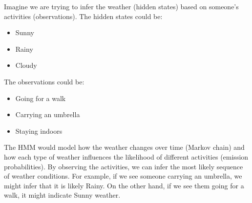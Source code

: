 \highspace
\begin{examplebox}
    Imagine we are trying to infer the weather (hidden states) based on someone's activities (observations). The hidden states could be:
    \begin{itemize}
        \item Sunny
        \item Rainy
        \item Cloudy
    \end{itemize}
    The observations could be:
    \begin{itemize}
        \item Going for a walk
        \item Carrying an umbrella
        \item Staying indoors
    \end{itemize}
    The HMM would model how the weather changes over time (Markov chain) and how each type of weather influences the likelihood of different activities (emission probabilities). By observing the activities, we can infer the most likely sequence of weather conditions. For example, if we see someone carrying an umbrella, we might infer that it is likely Rainy. On the other hand, if we see them going for a walk, it might indicate Sunny weather.
\end{examplebox}

